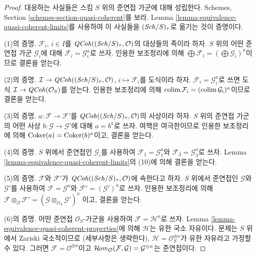 \begin{proof}
대응하는 사실들은 스킴 $S$ 위의 준연접 가군에 대해 성립한다. Schemes,
Section \ref{schemes-section-quasi-coherent}를 보라. Lemma
\ref{lemma-equivalence-quasi-coherent-limits}를 사용하여 이 사실들을
$(\mathit{Sch}/S)_\tau$로 옮기는 것이 증명이다.

\medskip\noindent
(1)의 증명. $\mathcal{F}_i$, $i \in I$를
$\mathit{QCoh}((\mathit{Sch}/S)_\tau, \mathcal{O})$의 대상들의 족이라 하자.
$S$ 위의 어떤 준연접 가군 $\mathcal{G}_i$에 대해
$\mathcal{F}_i = \mathcal{G}_i^a$로 쓰자. 인용한 보조정리에 의해
$\bigoplus \mathcal{F}_i = (\bigoplus \mathcal{G}_i)^a$이므로 결론을 얻는다.

\medskip\noindent
(2)의 증명. $\mathcal{I} \to \mathit{QCoh}((\mathit{Sch}/S)_\tau, \mathcal{O})$,
$i \mapsto \mathcal{F}_i$를 도식이라 하자.
$\mathcal{F}_i = \mathcal{G}_i^a$로 쓰면 도식
$\mathcal{I} \to \mathit{QCoh}(\mathcal{O}_S)$를 얻는다. 인용한 보조정리에 의해
$\mathop{\mathrm{colim}}\nolimits \mathcal{F}_i = (\mathop{\mathrm{colim}}\nolimits \mathcal{G}_i)^a$이므로 결론을 얻는다.

\medskip\noindent
(3)의 증명. $a : \mathcal{F} \to \mathcal{F}'$를
$\mathit{QCoh}((\mathit{Sch}/S)_\tau, \mathcal{O})$의 사상이라 하자. $S$ 위의 준연접
가군의 어떤 사상 $b : \mathcal{G} \to \mathcal{G}'$에 대해
$a = b^a$로 쓰자. 여핵은 여극한이므로 인용한 보조정리에 의해
$\mathop{\mathrm{Coker}}(a) = \mathop{\mathrm{Coker}}(b)^a$이고, 결론을 얻는다.

\medskip\noindent
(4)의 증명. $S$ 위에서 준연접인 $\mathcal{G}_i$를 사용하여
$\mathcal{F}_1 = \mathcal{G}_1^a$와
$\mathcal{F}_3 = \mathcal{G}_3^a$로 쓰자. Lemma
\ref{lemma-equivalence-quasi-coherent-limits}의 (10)에 의해 결론을 얻는다.

\medskip\noindent
(5)의 증명. $\mathcal{F}$와 $\mathcal{F}'$가
$\mathit{QCoh}((\mathit{Sch}/S)_\tau, \mathcal{O})$에 속한다고 하자. $S$ 위에서
준연접인 $\mathcal{G}$와 $\mathcal{G}'$를 사용하여
$\mathcal{F} = \mathcal{G}^a$와 $\mathcal{F}' = (\mathcal{G}')^a$로
쓰자. 인용한 보조정리에 의해
$\mathcal{F} \otimes_\mathcal{O} \mathcal{F}' =
(\mathcal{G} \otimes_{\mathcal{O}_S} \mathcal{G}')^a$
이고, 결론을 얻는다.

\medskip\noindent
(6)의 증명. 어떤 준연접 $\mathcal{O}_S$-가군을 사용하여
$\mathcal{F} = \mathcal{H}^a$로 쓰자. Lemma
\ref{lemma-equivalence-quasi-coherent-properties}에 의해
$\mathcal{H}$는 유한 국소 자유이다. 문제는 $S$ 위에서 Zariski 국소적이므로
(세부사항은 생략한다), $\mathcal{H} = \mathcal{O}_S^{\oplus n}$가
유한 자유라고 가정할 수 있다. 그러면 $\mathcal{F} = \mathcal{O}^{\oplus n}$이고
$\mathop{\mathcal{H}\!\mathit{om}}\nolimits_\mathcal{O}(\mathcal{F}, \mathcal{G}) = \mathcal{G}^{\oplus n}$는
준연접이다.
\end{proof}

